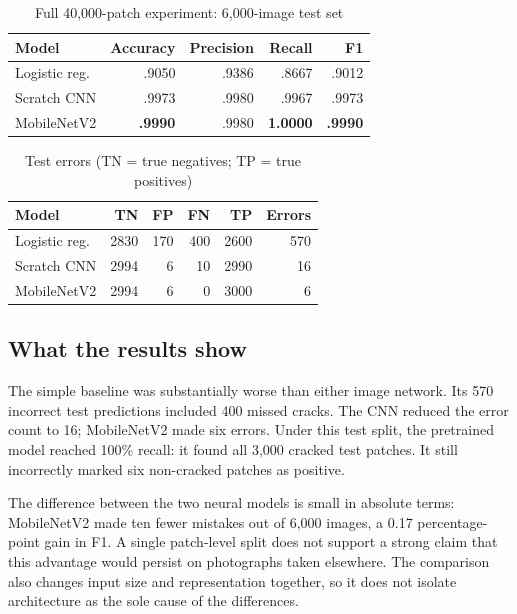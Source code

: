 \documentclass[conference,letterpaper]{IEEEtran}
\begin{document}
\begin{table}[!t]
\centering
\caption{Full 40,000-patch experiment: 6,000-image test set}
\label{tab:main}
\footnotesize
\begin{tabular}{lrrrr}
\toprule
Model & Accuracy & Precision & Recall & F1 \\
\midrule
Logistic reg. & .9050 & .9386 & .8667 & .9012 \\
Scratch CNN & .9973 & .9980 & .9967 & .9973 \\
MobileNetV2 & \textbf{.9990} & .9980 & \textbf{1.0000} & \textbf{.9990} \\
\bottomrule
\end{tabular}
\end{table}

\begin{table}[!t]
\centering
\caption{Test errors (TN = true negatives; TP = true positives)}
\label{tab:errors}
\footnotesize
\begin{tabular}{lrrrrr}
\toprule
Model & TN & FP & FN & TP & Errors \\
\midrule
Logistic reg. & 2830 & 170 & 400 & 2600 & 570 \\
Scratch CNN & 2994 & 6 & 10 & 2990 & 16 \\
MobileNetV2 & 2994 & 6 & 0 & 3000 & 6 \\
\bottomrule
\end{tabular}
\end{table}

\subsection{What the results show}
The simple baseline was substantially worse than either image network. Its 570 incorrect test predictions included 400 missed cracks. The CNN reduced the error count to 16; MobileNetV2 made six errors. Under this test split, the pretrained model reached 100\% recall: it found all 3,000 cracked test patches. It still incorrectly marked six non-cracked patches as positive.

The difference between the two neural models is small in absolute terms: MobileNetV2 made ten fewer mistakes out of 6,000 images, a 0.17 percentage-point gain in F1. A single patch-level split does not support a strong claim that this advantage would persist on photographs taken elsewhere. The comparison also changes input size and representation together, so it does not isolate architecture as the sole cause of the differences.
\end{document}
